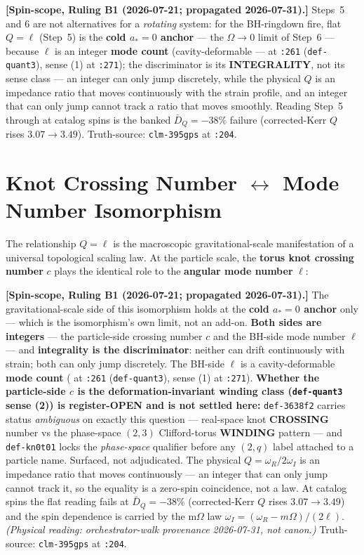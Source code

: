 \noindent\textbf{[Spin-scope, Ruling B1 (2026-07-21; propagated 2026-07-31).]}  Steps~5 and 6 are not
alternatives for a \emph{rotating} system: for the BH-ringdown fire, flat $Q = \ell$ (Step~5) is the
\textbf{cold $a_* = 0$ anchor} --- the $\Omega \to 0$ limit of Step~6 --- because $\ell$ is an integer
\textbf{mode count} (cavity-deformable ---  at \texttt{:261} (\texttt{def-quant3}), sense (1) at \texttt{:271}); the discriminator is its
\textbf{INTEGRALITY}, not its sense class --- an integer can only jump discretely, while the
physical $Q$ is an impedance ratio that moves continuously with the strain profile, and an integer that can
only jump cannot track a ratio that moves smoothly.  Reading Step~5 through at catalog spins is the banked $\bar D_Q = -38\%$ failure
(corrected-Kerr $Q$ rises $3.07 \to 3.49$).  Truth-source:
 \texttt{clm-395gps} at \texttt{:204}.


\section{Knot Crossing Number $\leftrightarrow$ Mode Number Isomorphism}
\label{sec:knot_mode_isomorphism}

The relationship $Q = \ell$ is the macroscopic gravitational-scale manifestation of a universal topological scaling law. At the particle scale, the \textbf{torus knot crossing number} $c$ plays the identical role to the \textbf{angular mode number} $\ell$:

\noindent\textbf{[Spin-scope, Ruling B1 (2026-07-21; propagated 2026-07-31).]}  The gravitational-scale
side of this isomorphism holds at the \textbf{cold $a_* = 0$ anchor} only --- which is the isomorphism's
own limit, not an add-on.  \textbf{Both sides are integers} --- the particle-side crossing number $c$ and
the BH-side mode number $\ell$ --- and \textbf{integrality is the discriminator}: neither can drift
continuously with strain; both can only jump discretely.  The BH-side $\ell$ is a
cavity-deformable \textbf{mode count}
( at \texttt{:261} (\texttt{def-quant3}), sense (1) at \texttt{:271}).  \textbf{Whether the particle-side $c$ is
the deformation-invariant winding class (\texttt{def-quant3} sense (2)) is register-OPEN and is not settled
here:} \texttt{def-3638f2} carries status \emph{ambiguous} on exactly this question --- real-space knot
\textbf{CROSSING} number vs the phase-space $(2,3)$ Clifford-torus \textbf{WINDING} pattern --- and
\texttt{def-kn0t01} locks the \emph{phase-space} qualifier before any $(2,q)$ label attached to a particle
name.  Surfaced, not adjudicated.  The physical $Q = \omega_R/2\omega_I$ is an impedance ratio that
moves continuously --- an integer that can only jump cannot track it, so the equality is a zero-spin
coincidence, not a law.  At catalog spins the flat
reading fails at $\bar D_Q = -38\%$ (corrected-Kerr $Q$ rises $3.07 \to 3.49$) and the spin dependence
is carried by the m$\Omega$ law $\omega_I = (\omega_R - m\Omega)/(2\ell)$.  \emph{(Physical reading:
orchestrator-walk provenance 2026-07-31, not canon.)}  Truth-source:
 \texttt{clm-395gps} at \texttt{:204}.

